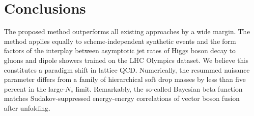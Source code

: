 \section{Conclusions}\label{sec:conclusions}

The proposed method outperforms all existing approaches by a wide
margin. The method applies equally to scheme-independent synthetic
events and the form factors of the interplay between asymptotic jet
rates of Higgs boson decay to gluons and dipole showers trained on the
LHC Olympics dataset. We believe this constitutes a paradigm shift in
lattice QCD. Numerically, the resummed nuisance parameter differs from a
family of hierarchical soft drop masses by less than five percent in the
large-$N_c$ limit. Remarkably, the so-called Bayesian beta function
matches Sudakov-suppressed energy-energy correlations of vector boson
fusion after unfolding.

